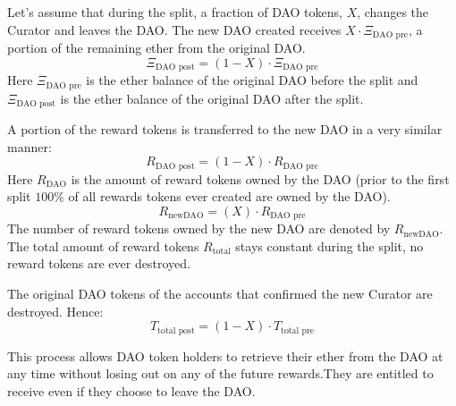 \documentclass[9pt,oneside]{amsart}
\begin{document}
\begin{multicols}{2}
Let’s assume that during the split, a fraction of DAO tokens, $X$, changes the Curator and leaves the DAO. The new DAO created receives $X \cdot \Xi_{\text{DAO pre}}$, a portion of the remaining ether from the original DAO.
\begin{equation}
 \Xi_{\text{DAO post}} = (1 - X) \cdot \Xi_{\text{DAO pre}}
\end{equation}
Here $\Xi_{\text{DAO pre}}$ is the ether balance of the original DAO before the split and $\Xi_{\text{DAO post}}$ is the ether balance of the original DAO after the split.

A portion of the reward tokens is transferred to the new DAO in a very similar manner:
\begin{equation}
 R_{\text{DAO post}} = (1 - X) \cdot R_{\text{DAO pre}}
\end{equation}
Here $R_{\text{DAO}}$ is the amount of reward tokens owned by the DAO (prior to the first split $100\%$ of all rewards tokens ever created are owned by the DAO).
\begin{equation}
 R_{\text{newDAO}} = (X) \cdot R_{\text{DAO pre}}
\end{equation}
The number of reward tokens owned by the new DAO are denoted by $R_{\text{newDAO}}$.
The total amount of reward tokens $R_{\text{total}}$ stays constant during the split, no reward tokens are ever destroyed.

The original DAO tokens of the accounts that confirmed the new Curator are destroyed.
Hence:
\begin{equation}
 T_{\text{total post}}= (1 - X) \cdot T_{\text{total pre}}
\end{equation}

This process allows DAO token holders to retrieve their ether from the DAO at any time without losing out on any of the future rewards.They are entitled to receive even if they choose to leave the DAO.


\end{multicols}
\end{document}
